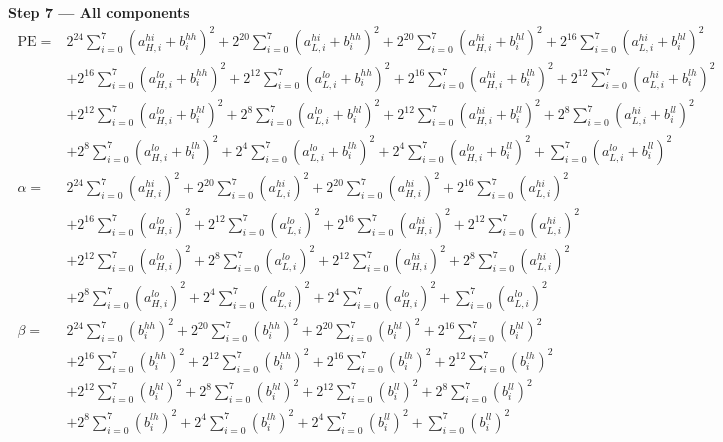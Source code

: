 \documentclass[fleqn]{article}
\begin{document}
\textbf{Step 7 --- All components}
\[
\boxed{\;
\begin{aligned}
\mathrm{PE} ={}& 2^{24}\sum_{i=0}^{7}(a_{H,i}^{hi}{+}b_i^{hh})^2 + 2^{20}\sum_{i=0}^{7}(a_{L,i}^{hi}{+}b_i^{hh})^2 + 2^{20}\sum_{i=0}^{7}(a_{H,i}^{hi}{+}b_i^{hl})^2 + 2^{16}\sum_{i=0}^{7}(a_{L,i}^{hi}{+}b_i^{hl})^2 \\
  & + 2^{16}\sum_{i=0}^{7}(a_{H,i}^{lo}{+}b_i^{hh})^2 + 2^{12}\sum_{i=0}^{7}(a_{L,i}^{lo}{+}b_i^{hh})^2 + 2^{16}\sum_{i=0}^{7}(a_{H,i}^{hi}{+}b_i^{lh})^2 + 2^{12}\sum_{i=0}^{7}(a_{L,i}^{hi}{+}b_i^{lh})^2 \\
  & + 2^{12}\sum_{i=0}^{7}(a_{H,i}^{lo}{+}b_i^{hl})^2 + 2^{8}\sum_{i=0}^{7}(a_{L,i}^{lo}{+}b_i^{hl})^2 + 2^{12}\sum_{i=0}^{7}(a_{H,i}^{hi}{+}b_i^{ll})^2 + 2^{8}\sum_{i=0}^{7}(a_{L,i}^{hi}{+}b_i^{ll})^2 \\
  & + 2^{8}\sum_{i=0}^{7}(a_{H,i}^{lo}{+}b_i^{lh})^2 + 2^{4}\sum_{i=0}^{7}(a_{L,i}^{lo}{+}b_i^{lh})^2 + 2^{4}\sum_{i=0}^{7}(a_{H,i}^{lo}{+}b_i^{ll})^2 + \sum_{i=0}^{7}(a_{L,i}^{lo}{+}b_i^{ll})^2 \\[0.6em]
\alpha ={}& 2^{24}\sum_{i=0}^{7}(a_{H,i}^{hi})^2 + 2^{20}\sum_{i=0}^{7}(a_{L,i}^{hi})^2 + 2^{20}\sum_{i=0}^{7}(a_{H,i}^{hi})^2 + 2^{16}\sum_{i=0}^{7}(a_{L,i}^{hi})^2 \\
  & + 2^{16}\sum_{i=0}^{7}(a_{H,i}^{lo})^2 + 2^{12}\sum_{i=0}^{7}(a_{L,i}^{lo})^2 + 2^{16}\sum_{i=0}^{7}(a_{H,i}^{hi})^2 + 2^{12}\sum_{i=0}^{7}(a_{L,i}^{hi})^2 \\
  & + 2^{12}\sum_{i=0}^{7}(a_{H,i}^{lo})^2 + 2^{8}\sum_{i=0}^{7}(a_{L,i}^{lo})^2 + 2^{12}\sum_{i=0}^{7}(a_{H,i}^{hi})^2 + 2^{8}\sum_{i=0}^{7}(a_{L,i}^{hi})^2 \\
  & + 2^{8}\sum_{i=0}^{7}(a_{H,i}^{lo})^2 + 2^{4}\sum_{i=0}^{7}(a_{L,i}^{lo})^2 + 2^{4}\sum_{i=0}^{7}(a_{H,i}^{lo})^2 + \sum_{i=0}^{7}(a_{L,i}^{lo})^2 \\[0.6em]
\beta ={}& 2^{24}\sum_{i=0}^{7}(b_i^{hh})^2 + 2^{20}\sum_{i=0}^{7}(b_i^{hh})^2 + 2^{20}\sum_{i=0}^{7}(b_i^{hl})^2 + 2^{16}\sum_{i=0}^{7}(b_i^{hl})^2 \\
  & + 2^{16}\sum_{i=0}^{7}(b_i^{hh})^2 + 2^{12}\sum_{i=0}^{7}(b_i^{hh})^2 + 2^{16}\sum_{i=0}^{7}(b_i^{lh})^2 + 2^{12}\sum_{i=0}^{7}(b_i^{lh})^2 \\
  & + 2^{12}\sum_{i=0}^{7}(b_i^{hl})^2 + 2^{8}\sum_{i=0}^{7}(b_i^{hl})^2 + 2^{12}\sum_{i=0}^{7}(b_i^{ll})^2 + 2^{8}\sum_{i=0}^{7}(b_i^{ll})^2 \\
  & + 2^{8}\sum_{i=0}^{7}(b_i^{lh})^2 + 2^{4}\sum_{i=0}^{7}(b_i^{lh})^2 + 2^{4}\sum_{i=0}^{7}(b_i^{ll})^2 + \sum_{i=0}^{7}(b_i^{ll})^2
\end{aligned}
\;}
\]
\end{document}
